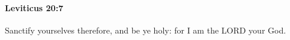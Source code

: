 
		\paragraph{Leviticus 20:7} %
			\label{LEVITICUS-20-7}

			Sanctify yourselves therefore, and be ye holy: for I am the LORD your God.



